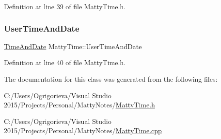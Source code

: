 Definition at line 39 of file Matty\+Time.\+h.

\hypertarget{classMattyTime_a7a1ceab576011e56405b49d7bd81e475}{}\label{classMattyTime_a7a1ceab576011e56405b49d7bd81e475} 
\subsubsection{\texorpdfstring{User\+Time\+And\+Date}{UserTimeAndDate}}
{\footnotesize\ttfamily \hyperlink{structTimeAndDate}{Time\+And\+Date} Matty\+Time\+::\+User\+Time\+And\+Date}



Definition at line 40 of file Matty\+Time.\+h.



The documentation for this class was generated from the following files\+:\begin{DoxyCompactItemize}
\item 
C\+:/\+Users/\+Ogrigorieva/\+Visual Studio 2015/\+Projects/\+Personal/\+Matty\+Notes/\hyperlink{MattyTime_8h}{Matty\+Time.\+h}\item 
C\+:/\+Users/\+Ogrigorieva/\+Visual Studio 2015/\+Projects/\+Personal/\+Matty\+Notes/\hyperlink{MattyTime_8cpp}{Matty\+Time.\+cpp}\end{DoxyCompactItemize}

